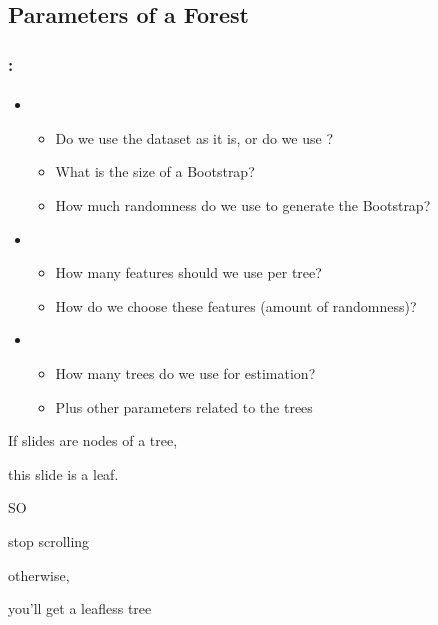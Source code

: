 \documentclass[xcolor=table]{beamer}
\begin{document}
\subsection{Parameters of a Forest}

\begin{frame}
	\frametitle{\insertshortsubtitle: \insertsection}
	\framesubtitle{\insertsubsection}
	
	\begin{itemize}
		\item {}
		\begin{itemize}
			\item Do we use the dataset as it is, or do we use ?
			\item What is the size of a Bootstrap?
			\item How much randomness do we use to generate the Bootstrap?
		\end{itemize}
		\item {}
		\begin{itemize}
			\item How many features should we use per tree?
			\item How do we choose these features (amount of randomness)?
		\end{itemize}
		\item {}
		\begin{itemize}
			\item How many trees do we use for estimation?
			\item Plus other parameters related to the trees
		\end{itemize}
	\end{itemize}
	
\end{frame}



\begin{frame}[plain]
	
	\begin{center}
		\Huge 
		If slides are nodes of a tree,
		
		this slide is a leaf.
		
		SO 
		
		stop scrolling
		
		otherwise, 
		
		you'll get a leafless tree
	\end{center}
	
\end{frame}
\end{document}

